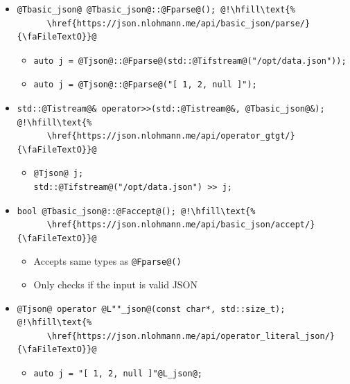 \documentclass{slides}
\providecommand{\lastpage}{2}
\begin{document}
\begin{itemize}
  \item \begin{lstlisting}[basicstyle={\ttfamily\fontsize{18pt}{18pt}\selectfont}]
@Tbasic_json@ @Tbasic_json@::@Fparse@(); @!\hfill\text{%
      \href{https://json.nlohmann.me/api/basic_json/parse/}{\faFileTextO}}@
    \end{lstlisting}
    \begin{itemize}
      \item \begin{lstlisting}
auto j = @Tjson@::@Fparse@(std::@Tifstream@("/opt/data.json"));
      \end{lstlisting}

      \item \begin{lstlisting}
auto j = @Tjson@::@Fparse@("[ 1, 2, null ]");
      \end{lstlisting}
    \end{itemize}

  \item \begin{lstlisting}[basicstyle={\ttfamily\fontsize{18pt}{18pt}\selectfont}]
std::@Tistream@& operator>>(std::@Tistream@&, @Tbasic_json@&); @!\hfill\text{%
      \href{https://json.nlohmann.me/api/operator_gtgt/}{\faFileTextO}}@
    \end{lstlisting}
    \begin{itemize}
      \item \begin{lstlisting}
@Tjson@ j;
std::@Tifstream@("/opt/data.json") >> j;
      \end{lstlisting}
    \end{itemize}

  \item \begin{lstlisting}[basicstyle={\ttfamily\fontsize{18pt}{18pt}\selectfont}]
bool @Tbasic_json@::@Faccept@(); @!\hfill\text{%
      \href{https://json.nlohmann.me/api/basic_json/accept/}{\faFileTextO}}@
    \end{lstlisting}
    \begin{itemize}
      \item Accepts same types as \lstinline{@Fparse@()}
      \item Only checks if the input is valid JSON
    \end{itemize}

  \item \begin{lstlisting}[basicstyle={\ttfamily\fontsize{18pt}{18pt}\selectfont}]
@Tjson@ operator @L""_json@(const char*, std::size_t); @!\hfill\text{%
      \href{https://json.nlohmann.me/api/operator_literal_json/}{\faFileTextO}}@
    \end{lstlisting}
    \begin{itemize}
      \item \lstinline{auto j = "[ 1, 2, null ]"@L_json@;}
    \end{itemize}
\end{itemize}

\end{document}
